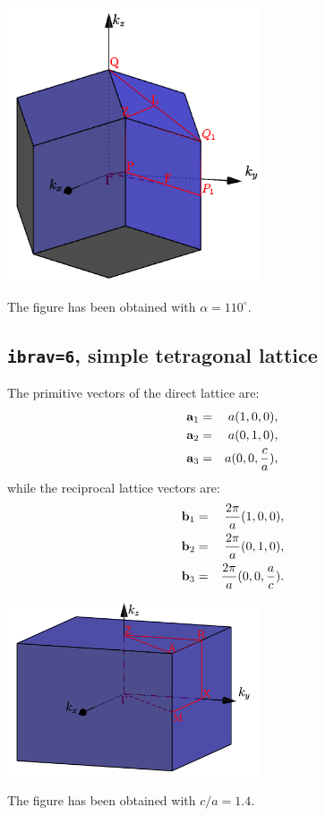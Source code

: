 \documentclass[12pt,a4paper]{article}
\begin{document}
\begin{center}
\includegraphics[width=7.5cm,angle=0]{images/tri_2.png}
\end{center}
The figure has been obtained with $\alpha=110^\circ$.

\subsection{\texttt{ibrav=6}, simple tetragonal lattice}
The primitive vectors of the direct lattice are:
\begin{eqnarray}
{\bf a}_1 &=& a (1, 0, 0), \nonumber \\
{\bf a}_2 &=& a (0, 1, 0), \nonumber \\
{\bf a}_3 &=& a (0, 0, {c\over a}), \nonumber
\nonumber
\end{eqnarray}
while the reciprocal lattice vectors are:
\begin{eqnarray}
{\bf b}_1 &=& {2\pi \over a} (1, 0, 0), \nonumber \\
{\bf b}_2 &=& {2\pi \over a} (0, 1, 0), \nonumber \\
{\bf b}_3 &=& {2\pi \over a} (0, 0, {a\over c}). \nonumber
\nonumber
\end{eqnarray}
\begin{center}
\includegraphics[width=7.5cm,angle=0]{images/st.png}
\end{center}
The figure has been obtained with $c/a=1.4$.
\end{document}
